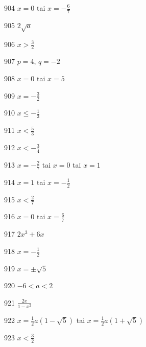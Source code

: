 \begin{Vastaus}{904}
$x=0$ tai $x=-\frac{6}{7}$
\end{Vastaus}
\begin{Vastaus}{905}
$2\sqrt{a}$
\end{Vastaus}
\begin{Vastaus}{906}
$x>\frac{3}{2}$
\end{Vastaus}
\begin{Vastaus}{907}
$p=4$, $q=-2$
\end{Vastaus}
\begin{Vastaus}{908}
$x=0$ tai $x=5$
\end{Vastaus}
\begin{Vastaus}{909}
$x=-\frac{3}{2}$
\end{Vastaus}
\begin{Vastaus}{910}
$x \leq -\frac{1}{3}$
\end{Vastaus}
\begin{Vastaus}{911}
$x<\frac{5}{3}$
\end{Vastaus}
\begin{Vastaus}{912}
$x<-\frac{3}{4}$
\end{Vastaus}
\begin{Vastaus}{913}
$x=-\frac{2}{7}$ tai $x=0$ tai $x=1$
\end{Vastaus}
\begin{Vastaus}{914}
$x=1$ tai $x=-\frac{1}{2}$
\end{Vastaus}
\begin{Vastaus}{915}
$x< \frac{2}{7} $
\end{Vastaus}
\begin{Vastaus}{916}
$x=0$ tai $x=\frac{6}{7}$
\end{Vastaus}
\begin{Vastaus}{917}
$2x^3+6x$
\end{Vastaus}
\begin{Vastaus}{918}
$x=-\frac{1}{2}$
\end{Vastaus}
\begin{Vastaus}{919}
$x=\pm \sqrt{5}$
\end{Vastaus}
\begin{Vastaus}{920}
$-6<a<2$
\end{Vastaus}
\begin{Vastaus}{921}
$\frac{2x}{1-x^2}$
\end{Vastaus}
\begin{Vastaus}{922}
$x= \frac{1}{2}a(1-\sqrt{5})$ tai $x= \frac{1}{2}a(1+\sqrt{5})$
\end{Vastaus}
\begin{Vastaus}{923}
$x<\frac{3}{2}$
\end{Vastaus}
